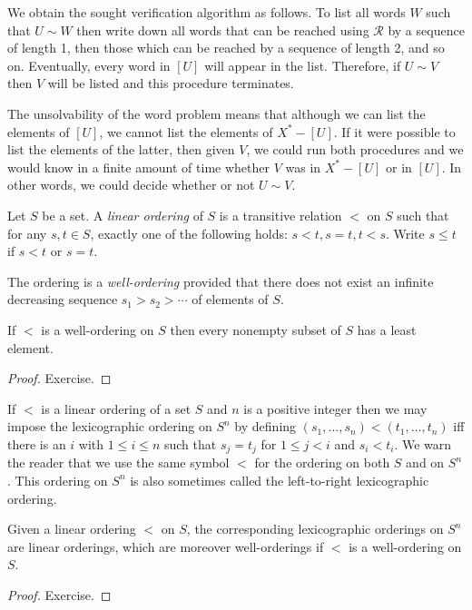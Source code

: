 \begin{ap} We obtain the sought verification algorithm as follows. To list all
    words $W$ such that $U\sim W$ then write down all words that can be reached
    using $\mathcal{R}$ by a sequence of length 1, then those which can be
    reached by a sequence of length 2, and so on. Eventually, every word in
    $[U]$ will appear in the list. Therefore, if $U\sim V$ then $V$ will be
    listed and this procedure terminates.

    The unsolvability of the word problem means that although we can list the
    elements of $[U]$, we cannot list the elements of $X^*-[U]$. If it were
    possible to list the elements of the latter, then given $V$, we could run
    both procedures and we would know in a finite amount of time whether $V$
    was in $X^*-[U]$ or in $[U]$. In other words, we could decide whether or
    not $U \sim V.$
\end{ap}

\begin{defn} Let $S$ be a set. A \emph{linear ordering} of $S$ is a transitive
    relation $<$ on $S$ such that for any $s,t\in S$, exactly one of the
    following holds: $s < t, s = t, t < s$. Write $s \le t$ if $s < t$ or $s =
    t$.

    The ordering is a \emph{well-ordering} provided that there does not exist
    an infinite decreasing sequence $s_1 > s_2 > \cdots $ of elements of $S$.
\end{defn}

\begin{prop} If $<$ is a well-ordering on $S$ then every nonempty subset of $S$
    has a least element.
\end{prop}
\begin{proof} Exercise.
\end{proof}

\begin{ap} If $<$ is a linear ordering of a set $S$ and $n$ is a positive
    integer then we may impose the lexicographic ordering on $S^n$ by defining
    $(s_1,\dots,s_n) < (t_1,\dots,t_n)$ iff there is an $i$ with $1 \le i \le
    n$ such that $s_j = t_j$ for $1\le j < i$ and $s_i < t_i$. We warn the
    reader that we use the same symbol $<$ for the ordering on both $S$ and on
    $S^n$. This ordering on $S^n$ is also sometimes called the left-to-right
    lexicographic ordering.
\end{ap}

\begin{prop} Given a linear ordering $<$ on $S$, the corresponding
    lexicographic orderings on $S^n$ are linear orderings, which are moreover
    well-orderings if $<$ is a well-ordering on $S$.
\end{prop}
\begin{proof} Exercise.
\end{proof}

